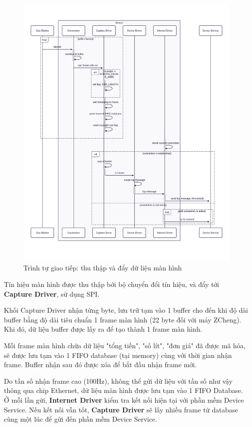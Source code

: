 \begin{figure}[!ht]
     \centering
    \includegraphics[width=1.0\linewidth]{Figures/Chap3_Device_firmware-implemetation-stream-screen.png}
    \caption{Trình tự giao tiếp: thu thập và đẩy dữ liệu màn hình}
    \label{fig:hinh3.10}
\end{figure}

Tín hiệu màn hình được thu thập bởi bộ chuyển đổi tín hiệu, và đẩy tới \textbf{Capture Driver}, sử dụng SPI.

Khối Capture Driver nhận từng byte, lưu trữ tạm vào 1 buffer cho đến khi độ dài buffer bằng độ dài tiêu chuẩn 1 frame màn hình (22 byte đối với máy ZCheng). Khi đó, dữ liệu buffer được lấy ra để tạo thành 1 frame màn hình.

Mỗi frame màn hình chữa dữ liệu "tổng tiền", "số lít", "đơn giá" đã được mã hóa, sẽ được lưu tạm vào 1 FIFO database (tại memory) cùng với thời gian nhận frame. Buffer nhận sau đó được xóa để bắt đầu nhận frame mới.

Do tần số nhận frame cao (100Hz), không thể gửi dữ liệu với tần số như vậy thông qua chip Ethernet, dữ liệu màn hình được lưu tạm vào 1 FIFO Database. Ở mỗi lần gửi, \textbf{Internet Driver} kiểm tra kết nối hiện tại với phần mềm Device Service. Nếu kết nối vẫn tốt, \textbf{Capture Driver} sẽ lấy nhiều frame từ database cùng một lúc để gửi đến phần mềm Device Service.

